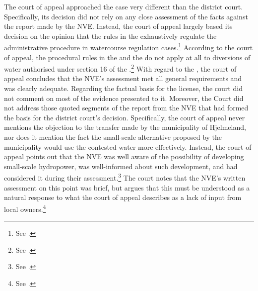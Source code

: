 The court of appeal approached the case very different than the district court. Specifically, its decision did not rely on any close assessment of the facts against the report made by the NVE. Instead, the court of appeal largely based its decision on the opinion that the rules in the \cite{wra17} exhaustively regulate the administrative procedure in watercourse regulation cases.\footnote{See \cite[7]{jorpeland11a}.} According to the court of appeal, the procedural rules in the \cite{ea59} and the \cite{paa67} do not apply at all to diversions of water authorised under section 16 of the \cite{wra17}.\footnote{See \cite[7]{jorpeland11a}.} 
 With regard to the \cite{wra17}, the court of appeal concludes that the NVE's assessment met all general requirements and was clearly adequate. Regarding the factual basis for the license, the court did not comment on most of the evidence presented to it. Moreover, the Court did not address those quoted segments of the report from the NVE that had formed the basis for the district court's decision. Specifically, the court of appeal never mentions the objection to the transfer made by the municipality of Hjelmeland, nor does it mention the fact the small-scale alternative proposed by the municipality would use the contested water more effectively. Instead, the court of appeal points out that the NVE was well aware of the possibility of developing small-scale hydropower, was well-informed about such development, and had considered it during their assessment.\footnote{See \cite[9]{jorpeland11a}.} The court notes that the NVE's written assessment on this point was brief, but argues that this must be understood as a natural response to what the court of appeal describes as a lack of input from local owners.\footnote{See \cite[9]{jorpeland11a}.}

